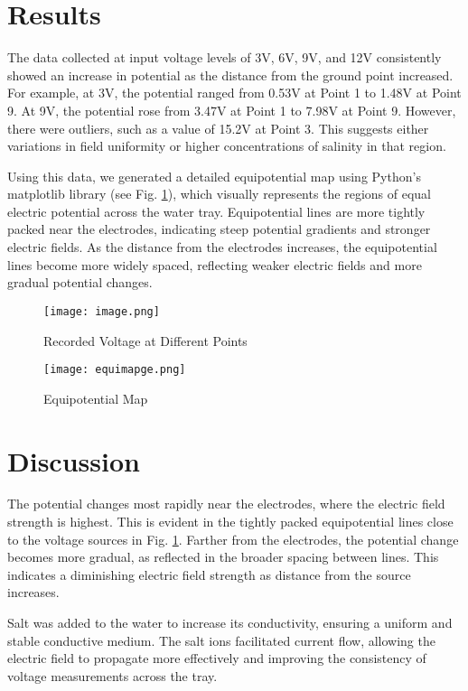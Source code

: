 \documentclass[conference]{IEEEtran}
\begin{document}
\section{Results}

The data collected at input voltage levels of 3V, 6V, 9V, and 12V consistently showed an increase in potential as the distance from the ground point increased. For example, at 3V, the potential ranged from 0.53V at Point 1 to 1.48V at Point 9. At 9V, the potential rose from 3.47V at Point 1 to 7.98V at Point 9. However, there were outliers, such as a value of 15.2V at Point 3. This suggests either variations in field uniformity or higher concentrations of salinity in that region.

Using this data, we generated a detailed equipotential map using Python’s matplotlib library (see Fig. \ref{fig:equipotential_map}), which visually represents the regions of equal electric potential across the water tray. Equipotential lines are more tightly packed near the electrodes, indicating steep potential gradients and stronger electric fields. As the distance from the electrodes increases, the equipotential lines become more widely spaced, reflecting weaker electric fields and more gradual potential changes.

\begin{figure}[ht]
    \centering
    \texttt{[image: image.png]}
    \caption{Recorded Voltage at Different Points}
    \label{fig:voltage_data}

        \vspace{5mm} 
    \texttt{[image: equimapge.png]}
    \caption{Equipotential Map}
    \label{fig:equipotential_map}
\end{figure}



 \newpage \section{Discussion}
The potential changes most rapidly near the electrodes, where the electric field strength is highest. This is evident in the tightly packed equipotential lines close to the voltage sources in Fig. \ref{fig:equipotential_map}. Farther from the electrodes, the potential change becomes more gradual, as reflected in the broader spacing between lines. This indicates a diminishing electric field strength as distance from the source increases.

Salt was added to the water to increase its conductivity, ensuring a uniform and stable conductive medium. The salt ions facilitated current flow, allowing the electric field to propagate more effectively and improving the consistency of voltage measurements across the tray.
\end{document}
